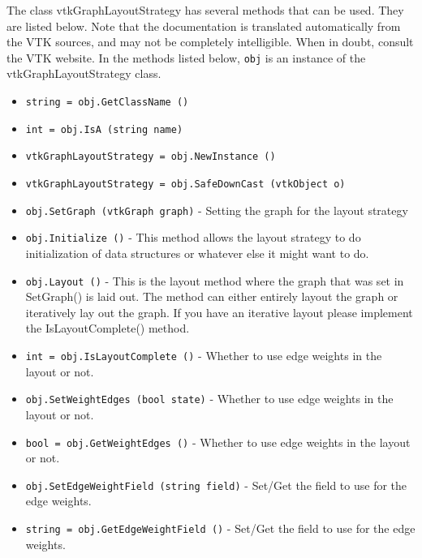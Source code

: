 The class vtkGraphLayoutStrategy has several methods that can be used.
  They are listed below.
Note that the documentation is translated automatically from the VTK sources,
and may not be completely intelligible.  When in doubt, consult the VTK website.
In the methods listed below, \verb|obj| is an instance of the vtkGraphLayoutStrategy class.
\begin{itemize}
\item  \verb|string = obj.GetClassName ()|

\item  \verb|int = obj.IsA (string name)|

\item  \verb|vtkGraphLayoutStrategy = obj.NewInstance ()|

\item  \verb|vtkGraphLayoutStrategy = obj.SafeDownCast (vtkObject o)|

\item  \verb|obj.SetGraph (vtkGraph graph)| -  Setting the graph for the layout strategy

\item  \verb|obj.Initialize ()| -  This method allows the layout strategy to
 do initialization of data structures
 or whatever else it might want to do. 

\item  \verb|obj.Layout ()| -  This is the layout method where the graph that was
 set in SetGraph() is laid out. The method can either
 entirely layout the graph or iteratively lay out the
 graph. If you have an iterative layout please implement
 the IsLayoutComplete() method.

\item  \verb|int = obj.IsLayoutComplete ()| -  Whether to use edge weights in the layout or not.

\item  \verb|obj.SetWeightEdges (bool state)| -  Whether to use edge weights in the layout or not.

\item  \verb|bool = obj.GetWeightEdges ()| -  Whether to use edge weights in the layout or not.

\item  \verb|obj.SetEdgeWeightField (string field)| -  Set/Get the field to use for the edge weights.

\item  \verb|string = obj.GetEdgeWeightField ()| -  Set/Get the field to use for the edge weights.

\end{itemize}
